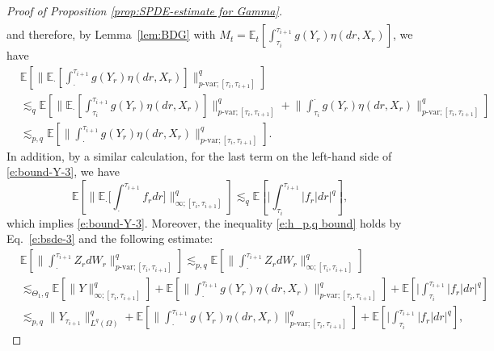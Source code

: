 \documentclass[11pt,reqno]{amsart}
\numberwithin{equation}{section}
\begin{document}
\begin{proof}[Proof of Proposition \ref{prop:SPDE-estimate for Gamma}]
\begin{equation}
\begin{aligned}
\end{aligned}
\end{equation}
and therefore, by Lemma~\ref{lem:BDG} with $M_t = \mathbb{E}_{t}[\int_{\tau_{i}}^{\tau_{i+1}}g(Y_{r})\eta(dr,X_{r})]$, we have 
\begin{equation}\label{e:BDG+Doob}
\begin{aligned}
&\mathbb{E}\left[\bigg\|\mathbb{E}_{\cdot}\left[\int_{\cdot}^{\tau_{i+1}} g(Y_{r}) \eta(dr,X_{r})\right]\bigg\|^{q}_{p\text{-var};[\tau_{i},\tau_{i+1}]}\right]\\
&\lesssim_{q} \mathbb{E}\left[\bigg\|\mathbb{E}_{\cdot}\left[\int_{\tau_{i}}^{\tau_{i+1}} g(Y_{r}) \eta(dr,X_{r})\right]\bigg\|^{q}_{p\text{-var};[\tau_{i},\tau_{i+1}]} + \Big\| \int_{\tau_{i}}^{\cdot} g(Y_{r}) \eta(dr,X_{r})\Big\|^{q}_{p\text{-var};[\tau_{i},\tau_{i+1}]}\right]\\
&\lesssim_{p,q} \mathbb{E}\left[\Big\| \int_{\cdot}^{\tau_{i+1}} g(Y_{r}) \eta(dr,X_{r})\Big\|^{q}_{p\text{-var};[\tau_{i},\tau_{i+1}]}\right]. 
\end{aligned}
\end{equation}
In addition, by a similar calculation, for the last term on the left-hand side of \eqref{e:bound-Y-3}, we have
\begin{equation*}
\mathbb{E}\left[\bigg\|\mathbb{E}_{\cdot}\Big[\int_{\cdot}^{\tau_{i+1}}f_{r}dr\Big]\bigg\|^{q}_{\infty;[\tau_{i},\tau_{i+1}]}\right] \lesssim_{q} \mathbb{E}\left[\Big|\int_{\tau_{i}}^{\tau_{i+1}}|f_{r}|dr\Big|^{q}\right],
\end{equation*}
which implies \eqref{e:bound-Y-3}.
Moreover, the inequality \eqref{e:h_p,q bound} holds by Eq.~\eqref{e:bsde-3} and the following estimate:
\begin{equation*}
\begin{aligned}
&\mathbb{E}\left[\Big\|\int_{\cdot}^{\tau_{i+1}}Z_{r}dW_{r}\Big\|^{q}_{p\text{-var};[\tau_{i},\tau_{i+1}]}\right] \lesssim_{p,q}\mathbb{E}\left[\Big\|\int_{\cdot}^{\tau_{i+1}}Z_{r}dW_{r}\Big\|^{q}_{\infty;[\tau_{i},\tau_{i+1}]}\right]\\
&\lesssim_{\Theta_{1},q} \mathbb{E}\left[\|Y\|^{q}_{\infty;[\tau_{i},\tau_{i+1}]}\right] + \mathbb{E}\left[\Big\|\int_{\cdot}^{\tau_{i+1}}g(Y_{r})\eta(dr,X_{r})\Big\|^{q}_{p\text{-var};[\tau_{i},\tau_{i+1}]}\right] + \mathbb{E}\left[\Big|\int_{\tau_{i}}^{\tau_{i+1}}|f_{r}|dr\Big|^{q}\right]\\
&\lesssim_{p,q} \|Y_{\tau_{i+1}}\|^{q}_{L^{q}(\Omega)} + \mathbb{E}\left[\Big\|\int_{\cdot}^{\tau_{i+1}}g(Y_{r})\eta(dr,X_{r})\Big\|^{q}_{p\text{-var};[\tau_{i},\tau_{i+1}]}\right] + \mathbb{E}\left[\Big|\int_{\tau_{i}}^{\tau_{i+1}}|f_{r}|dr\Big|^{q}\right],

\end{aligned}
\end{equation*}
\end{proof}
\end{document}
